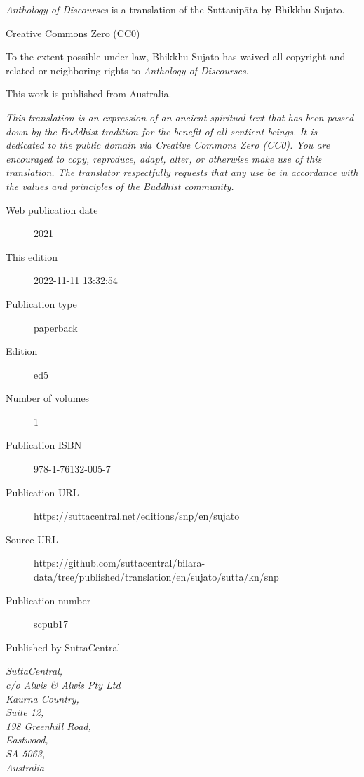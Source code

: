 \documentclass[12pt,openany]{book}%
\begin{document}
\begin{footnotesize}

\textit{Anthology of Discourses} is a translation of the Suttanipāta by Bhikkhu Sujato.

\medskip

Creative Commons Zero (CC0)

To the extent possible under law, Bhikkhu Sujato has waived all copyright and related or neighboring rights to \textit{Anthology of Discourses}.

\medskip

This work is published from Australia.

\begin{center}
\textit{This translation is an expression of an ancient spiritual text that has been passed down by the Buddhist tradition for the benefit of all sentient beings. It is dedicated to the public domain via Creative Commons Zero (CC0). You are encouraged to copy, reproduce, adapt, alter, or otherwise make use of this translation. The translator respectfully requests that any use be in accordance with the values and principles of the Buddhist community.}
\end{center}

\medskip

\begin{description}
    \item[Web publication date] 2021
    \item[This edition] 2022-11-11 13:32:54
    \item[Publication type] paperback
    \item[Edition] ed5
    \item[Number of volumes] 1
    \item[Publication ISBN] 978-1-76132-005-7
    \item[Publication URL] https://suttacentral.net/editions/snp/en/sujato
    \item[Source URL] https://github.com/suttacentral/bilara-data/tree/published/translation/en/sujato/sutta/kn/snp
    \item[Publication number] scpub17
\end{description}

\medskip

Published by SuttaCentral

\medskip

\textit{SuttaCentral,\\
c/o Alwis \& Alwis Pty Ltd\\
Kaurna Country,\\
Suite 12,\\
198 Greenhill Road,\\
Eastwood,\\
SA 5063,\\
Australia}

\end{footnotesize}
\end{document}
